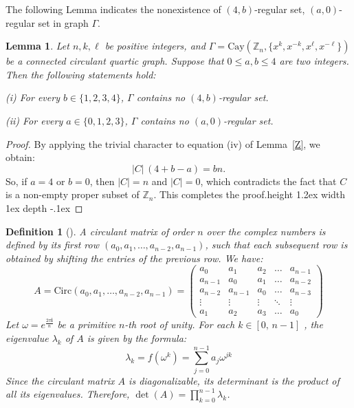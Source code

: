 \documentclass[12pt]{article}
\def\bull{\vrule height 1.2ex width 1ex depth -.1ex }
\newtheorem{definition}[formula]{Definition}
\newtheorem{lem}[formula]{Lemma}
\begin{document}
	The following Lemma indicates the nonexistence of $(4,b)$-regular set, $(a,0)$-regular set in graph $\Gamma$.
	\begin{lem}\label{2elem}
		Let $n, k, \ell$ be positive integers, and  $\Gamma = \mathrm{Cay}(\mathbb{Z}_n,\{x^{k}, x^{-k}, x^{\ell}, x^{-\ell}\})$ be a connected circulant quartic graph. Suppose that $0 \le a,b \le 4$  are two integers. Then the following statements hold:
		
		(i) For every $b \in \{1,2,3,4\}$, $\Gamma$ contains no $(4,b)$-regular set.
		
		(ii) For every $a \in \{0,1,2,3\}$, $\Gamma$ contains no $(a,0)$-regular set.
	\end{lem}
	
	\begin{proof}
        By applying the trivial character to equation (iv) of Lemma~\ref{Z}, we obtain:
			\[
			|C|\,(4 + b - a) = bn.
			\]
		So, if $a=4$ or $b=0$, then $|C| = n$ and $|C| = 0$, which contradicts the fact that $C$ is a non-empty proper subset of $\mathbb{Z}_n$.	
	 This completes the proof.\hfill\bull
		\end{proof}
		
	\begin{definition}[{\cite[Theorem~1, Corollary1]{AGW}}]\label{circulant}
	A circulant matrix of order $n$ over the complex numbers is defined by its first row
	$(a_0, a_1, \dots, a_{n-2}, a_{n-1})$,
	such that each subsequent row is obtained by shifting the entries of the previous row. We have:
	\[
	A = \mathrm{Circ}(a_0, a_1, \dots, a_{n-2}, a_{n-1}) =
	\begin{pmatrix}
		a_0 & a_1 & a_2 & \dots  & a_{n-1} \\
		a_{n-1} & a_0 & a_1 & \dots & a_{n-2} \\
		a_{n-2} & a_{n-1} & a_0 & \dots & a_{n-3} \\
		\vdots & \vdots & \vdots & \ddots & \vdots \\
		a_1 & a_2 & a_3 & \dots & a_0
	\end{pmatrix}
	\]
	Let $\omega = e^{\frac{2\pi \mathbf{i}}{n}}$ be a primitive $n$-th root of unity.
	For each $k \in [0,\, n-1]$ , the eigenvalue $\lambda_k$ of $A$ is given by the formula:
	\[
	\lambda_k = f(\omega^k) = \sum_{j=0}^{n-1} a_j \omega^{jk}
	\]
	Since the circulant matrix $A$ is diagonalizable, its determinant is the product of all its eigenvalues. Therefore, $\det(A) = \prod_{k=0}^{n-1} \lambda_k$.
		\end{definition}
		
\end{document}
